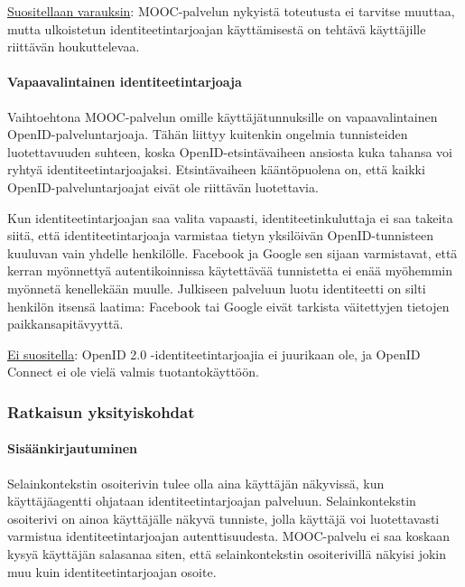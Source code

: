 \documentclass[finnish,gradu]{tktltiki}
\begin{document}
  \underline{Suositellaan varauksin}: MOOC-palvelun nykyistä toteutusta ei tarvitse muuttaa, mutta ulkoistetun identiteetintarjoajan käyttämisestä on tehtävä käyttäjille riittävän houkuttelevaa.



  \paragraph{Vapaavalintainen identiteetintarjoaja} \hfill %
  \label{par:vapaavalintainen_identiteetintarjoaja}

  Vaihtoehtona MOOC-palvelun omille käyttäjätunnuksille on vapaavalintainen OpenID-palveluntarjoaja. Tähän liittyy kuitenkin ongelmia tunnisteiden luotettavuuden suhteen, koska OpenID-etsintävaiheen ansiosta kuka tahansa voi ryhtyä identiteetintarjoajaksi. Etsintävaiheen kääntöpuolena on, että kaikki OpenID-palveluntarjoajat eivät ole riittävän luotettavia.

  Kun identiteetintarjoajan saa valita vapaasti, identiteetinkuluttaja ei saa takeita siitä, että identiteetintarjoaja varmistaa tietyn yksilöivän OpenID-tunnisteen kuuluvan vain yhdelle henkilölle. Facebook ja Google sen sijaan varmistavat, että kerran myönnettyä autentikoinnissa käytettävää tunnistetta ei enää myöhemmin myönnetä kenellekään muulle. Julkiseen palveluun luotu identiteetti on silti henkilön itsensä laatima: Facebook tai Google eivät tarkista väitettyjen tietojen paikkansapitävyyttä.

  \underline{Ei suositella}: OpenID 2.0 -identiteetintarjoajia ei juurikaan ole, ja OpenID Connect ei ole vielä valmis tuotantokäyttöön.



  \subsubsection{Ratkaisun yksityiskohdat} %
  \label{ssub:toteutuksen_yksityiskohdat}

  \paragraph{Sisäänkirjautuminen} \hfill %
  \label{par:sisäänkirjautuminen}

  Selainkontekstin osoiterivin tulee olla aina käyttäjän näkyvissä, kun käyttäjäagentti ohjataan identiteetintarjoajan palveluun. Selainkontekstin osoiterivi on ainoa käyttäjälle näkyvä tunniste, jolla käyttäjä voi luotettavasti varmistua identiteetintarjoajan autenttisuudesta. MOOC-palvelu ei saa koskaan kysyä käyttäjän salasanaa siten, että selainkontekstin osoiterivillä näkyisi jokin muu kuin identiteetintarjoajan osoite.
\end{document}
